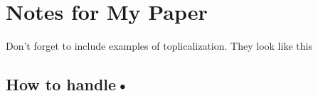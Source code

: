\documentclass[a4paper,12pt]{article}
\begin{document}
\section*{Notes for My Paper}
	Don't forget to include examples of toplicalization. They look like this
\subsection*{How to handle•}
\end{document}
